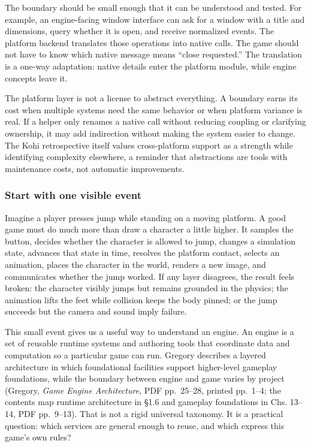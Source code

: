 The boundary should be small enough that it can be understood and tested. For example, an engine-facing window interface can ask for a window with a title and dimensions, query whether it is open, and receive normalized events. The platform backend translates those operations into native calls. The game should not have to know which native message means ``close requested.'' The translation is a one-way adaptation: native details enter the platform module, while engine concepts leave it.

The platform layer is not a license to abstract everything. A boundary earns its cost when multiple systems need the same behavior or when platform variance is real. If a helper only renames a native call without reducing coupling or clarifying ownership, it may add indirection without making the system easier to change. The Kohi retrospective itself values cross-platform support as a strength while identifying complexity elsewhere, a reminder that abstractions are tools with maintenance costs, not automatic improvements.

\subsubsection{Start with one visible event}\label{start-with-one-visible-event}

Imagine a player presses jump while standing on a moving platform. A good game must do much more than draw a character a little higher. It samples the button, decides whether the character is allowed to jump, changes a simulation state, advances that state in time, resolves the platform contact, selects an animation, places the character in the world, renders a new image, and communicates whether the jump worked. If any layer disagrees, the result feels broken: the character visibly jumps but remains grounded in the physics; the animation lifts the feet while collision keeps the body pinned; or the jump succeeds but the camera and sound imply failure.

This small event gives us a useful way to understand an engine. An engine is a set of reusable runtime systems and authoring tools that coordinate data and computation so a particular game can run. Gregory describes a layered architecture in which foundational facilities support higher-level gameplay foundations, while the boundary between engine and game varies by project (Gregory, \emph{Game Engine Architecture}, PDF pp.~25--28, printed pp.~1--4; the contents map runtime architecture in §1.6 and gameplay foundations in Chs. 13--14, PDF pp.~9--13). That is not a rigid universal taxonomy. It is a practical question: which services are general enough to reuse, and which express this game's own rules?


